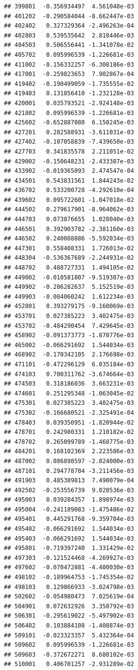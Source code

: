 \documentclass[ignorenonframetext,]{beamer}
\begin{document}
\begin{frame}[fragile]
\begin{verbatim}
## 399801  -0.356934497  4.561048e-03
## 401202  -0.290584044 -8.662447e-03
## 402402   0.327329364 -2.496263e-04
## 402803   0.539535642  2.818446e-03
## 404503   0.506556441 -1.341078e-02
## 405702   0.095996539 -1.226681e-03
## 411002  -0.156332257 -6.308186e-03
## 417001  -0.259823653  7.902867e-04
## 419402  -0.190499059 -1.735555e-02
## 419403   0.131856410 -1.232128e-03
## 420001   0.035793521 -2.924148e-03
## 421802   0.095996539 -1.226681e-03
## 425602  -0.652887080  6.150245e-03
## 427201   0.282588931 -3.611031e-03
## 427402  -0.107058839 -7.439650e-03
## 427703   0.341835578  2.211051e-02
## 429002  -0.150648231 -2.433387e-03
## 433902  -0.019365093  2.474547e-04
## 434501   0.543831561  1.844243e-02
## 436702   0.533200728 -4.292610e-04
## 439602   0.095722601 -1.047018e-02
## 444502   0.279617901 -8.964062e-03
## 444703   0.073876655  1.028040e-03
## 446501   0.392903782 -2.381160e-03
## 446502   0.240088886 -5.592034e-03
## 447301   0.558408331  1.726013e-02
## 448304  -0.536367689 -2.244931e-02
## 448702   0.488727331  1.494105e-02
## 449002  -0.010581807 -9.519387e-03
## 449902  -0.286282637  5.152519e-03
## 449903  -0.084060242  1.612234e-03
## 452801   0.393279175 -9.160069e-03
## 453701   0.027385223  3.402475e-03
## 453702  -0.484290454  7.429645e-03
## 458902  -0.091373773 -1.870776e-03
## 465002  -0.066291692  1.544034e-03
## 468902  -0.170342105  2.176698e-03
## 471101  -0.472296129  6.035184e-03
## 474103   0.700311762 -3.674664e-03
## 474503   0.318186036  3.663231e-03
## 474601   0.251295348 -1.063045e-02
## 475301   0.027385223  3.402475e-03
## 475302  -0.166680521 -2.325491e-04
## 478403   0.039350951 -1.820944e-02
## 478701   0.242980331  1.210182e-02
## 478702   0.265099789 -1.468775e-03
## 484201   0.168102369  2.223586e-03
## 487002   0.086898597 -2.024000e-03
## 487101   0.294778704 -3.211456e-03
## 491903   0.485389813  7.490079e-04
## 492502  -0.253556739  9.020536e-03
## 495003   0.039284357  1.898974e-03
## 495004  -0.241189083 -1.475486e-02
## 495401   0.445291768 -9.359704e-03
## 495402  -0.066291692  1.544034e-03
## 495403  -0.066291692  1.544034e-03
## 495801  -0.719397240  1.331429e-02
## 497303  -0.121524468 -4.269927e-03
## 497602  -0.070472881 -4.400030e-03
## 498102  -0.189964753 -1.745354e-02
## 498103   0.129866933 -3.024798e-03
## 502602  -0.054980473  7.025619e-04
## 504901   0.072632926  3.350792e-03
## 506301  -0.295619022 -5.497902e-03
## 506402   0.103884108 -1.408874e-03
## 509101  -0.023323357  5.432364e-04
## 509602   0.095996539 -1.226681e-03
## 509603  -0.372672271  8.680102e-03
## 510001   0.406701257 -2.931289e-02

\end{verbatim}
\end{frame}
\end{document}
